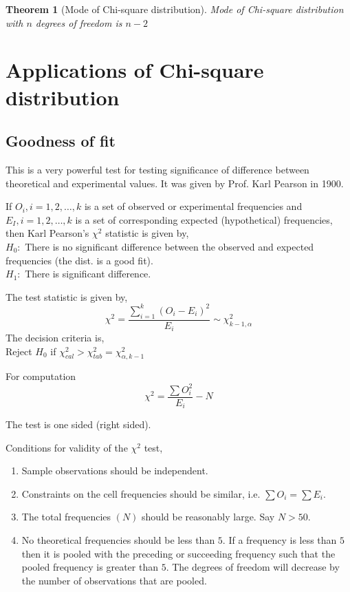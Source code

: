 \documentclass[oneside,11pt,pdftex]{book}%
\numberwithin{equation}{section}
\newtheorem{theorem}{Theorem}[chapter]%
\numberwithin{section}{chapter}
\numberwithin{equation}{chapter}
\begin{document}
\begin{theorem}[Mode of Chi-square distribution]
	Mode of Chi-square distribution with $ n $ degrees of freedom is $ n-2 $
\end{theorem}


\section{Applications of Chi-square distribution}
\subsection{Goodness of fit}
This is a very powerful test for testing significance of difference between theoretical and experimental values. It was given by Prof. Karl Pearson in 1900.

If $ O_i, i=1,2,\dots, k $ is a set of observed or experimental frequencies and $ E_I, i=1,2,\dots,k$ is a set of corresponding expected (hypothetical) frequencies, then Karl Pearson's $ \chi^2 $ statistic is given by,\\
$ H_0: $ There is no significant difference between the observed and expected frequencies (the dist. is a good fit).\\
$ H_1: $ There is significant difference.

The test statistic is given by, 
\[ \chi^2=\frac{\sum_{i=1}^k (O_i-E_i)^2}{E_i} \sim \chi^2_{k-1,\alpha}\]
The decision criteria is,\\
Reject $ H_0 $ if $ \chi^2_{cal} > \chi^2_{tab}=\chi^2_{\alpha,k-1}$

For computation \[ \chi^2=\frac{\sum O_i^2}{E_i} - N\]

The test is one sided (right sided).

Conditions for validity of the $ \chi^2 $ test,
\begin{enumerate}
	\item Sample observations should be independent.
	\item Constraints on the cell frequencies should be similar, i.e. $ \sum O_i = \sum E_i $.
	\item The total frequencies $ (N) $ should be reasonably large. Say $ N>50 $.
	\item No theoretical frequencies should be less than $ 5 $. If a frequency is less than $ 5 $ then it is pooled with the preceding or succeeding frequency such that the pooled frequency is greater than $ 5 $. The degrees of freedom will decrease by the number of observations that are pooled.
\end{enumerate}
\end{document}
